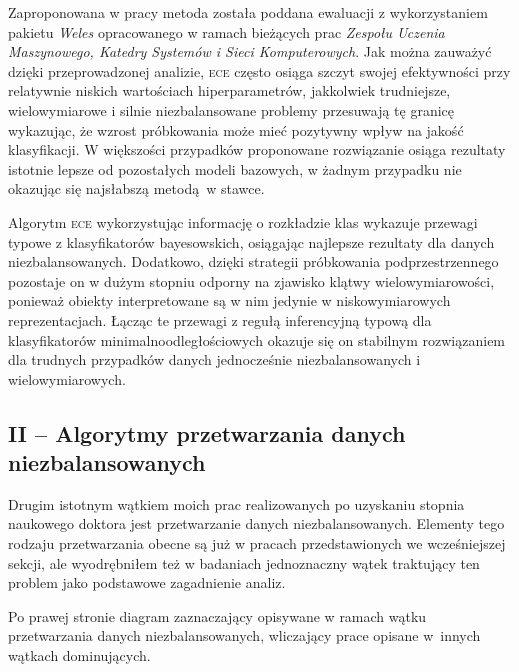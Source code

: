 Zaproponowana w pracy metoda została poddana ewaluacji z wykorzystaniem pakietu \emph{Weles} opracowanego w ramach bieżących prac \emph{Zespołu Uczenia Maszynowego, Katedry Systemów i Sieci Komputerowych}. Jak można zauważyć dzięki przeprowadzonej analizie, \textsc{ece} często osiąga szczyt swojej efektywności przy relatywnie niskich wartościach hiperparametrów, jakkolwiek trudniejsze, wielowymiarowe i silnie niezbalansowane problemy przesuwają tę granicę wykazując, że wzrost próbkowania może mieć pozytywny wpływ na jakość klasyfikacji. W większości przypadków proponowane rozwiązanie osiąga rezultaty istotnie lepsze od pozostałych modeli bazowych, w żadnym przypadku nie okazując się najsłabszą metodą w stawce.

Algorytm \textsc{ece} wykorzystując informację o rozkładzie klas wykazuje przewagi typowe z klasyfikatorów bayesowskich, osiągając najlepsze rezultaty dla danych niezbalansowanych. Dodatkowo, dzięki strategii próbkowania podprzestrzennego pozostaje on w dużym stopniu odporny na zjawisko klątwy wielowymiarowości, ponieważ obiekty interpretowane są w nim jedynie w niskowymiarowych reprezentacjach. Łącząc te przewagi z regułą inferencyjną typową dla klasyfikatorów minimalnoodległościowych okazuje się on stabilnym rozwiązaniem dla trudnych przypadków danych jednocześnie niezbalansowanych i wielowymiarowych.  

\subsection*{II -- Algorytmy przetwarzania danych niezbalansowanych}

\marginnote{\scalebox{.6}{}}

Drugim istotnym wątkiem moich prac realizowanych po uzyskaniu stopnia naukowego doktora jest przetwarzanie danych niezbalansowanych. Elementy tego rodzaju przetwarzania obecne są już w pracach przedstawionych we wcześniejszej sekcji, ale wyodrębniłem też w badaniach jednoznaczny wątek traktujący ten problem jako podstawowe zagadnienie analiz.

Po prawej stronie diagram zaznaczający opisywane w ramach wątku przetwarzania danych niezbalansowanych, wliczający prace opisane w~innych wątkach dominujących.
\vspace{1em}

